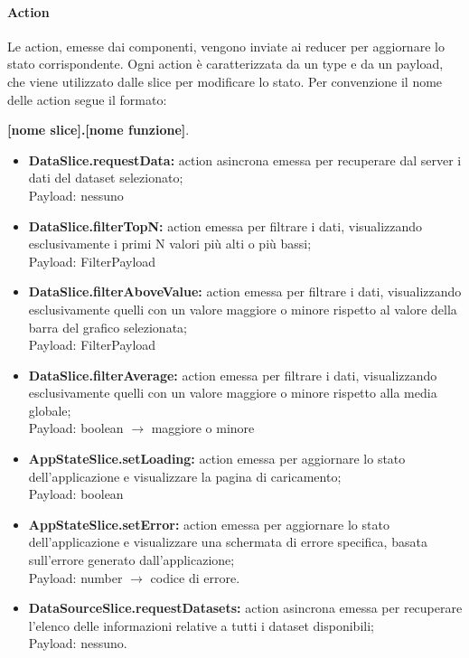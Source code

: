 \paragraph{Action}
    Le action, emesse dai componenti, vengono inviate ai reducer per aggiornare lo stato corrispondente.
    Ogni action è caratterizzata da un type e da un payload, che viene utilizzato dalle slice per modificare lo stato.
    Per convenzione il nome delle action segue il formato: \\
    \begin{center}
        \textbf{[nome slice].[nome funzione]}.
    \end{center}
    \begin{itemize}
        \item \textbf{DataSlice.requestData:} action asincrona emessa per recuperare dal server i dati del dataset selezionato; \\ Payload: nessuno
        \item \textbf{DataSlice.filterTopN:} action emessa per filtrare i dati, visualizzando esclusivamente i primi N valori più alti o più bassi; \\ Payload: FilterPayload
        \item \textbf{DataSlice.filterAboveValue:} action emessa per filtrare i dati, visualizzando esclusivamente quelli con un valore maggiore o minore rispetto al valore della barra del grafico selezionata;\\ Payload: FilterPayload
        \item \textbf{DataSlice.filterAverage:} action emessa per filtrare i dati, visualizzando esclusivamente quelli con un valore maggiore o minore rispetto alla media globale; \\ Payload: boolean $\rightarrow$ maggiore o minore
        \item \textbf{AppStateSlice.setLoading:} action emessa per aggiornare lo stato dell'applicazione e visualizzare la pagina di caricamento; \\ Payload: boolean
        \item \textbf{AppStateSlice.setError:} action emessa per aggiornare lo stato dell'applicazione e visualizzare una schermata di errore specifica, basata sull'errore generato dall'applicazione; \\ Payload: number $\rightarrow$ codice di errore.
        \item \textbf{DataSourceSlice.requestDatasets:} action asincrona emessa per recuperare l'elenco delle informazioni relative a tutti i dataset disponibili; \\ Payload: nessuno.

\end{itemize}
